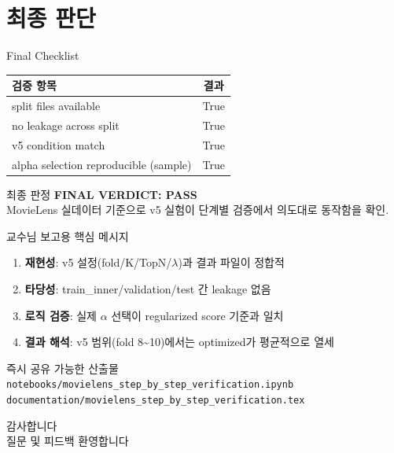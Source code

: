 \documentclass[aspectratio=169,10pt]{beamer}
\begin{document}
\section{최종 판단}

\begin{frame}{Final Checklist}
  \begin{center}
  \renewcommand{\arraystretch}{1.3}
  \begin{tabular}{l|c}
    \toprule
    \textbf{검증 항목} & \textbf{결과} \\
    \midrule
    split files available & True \\
    no leakage across split & True \\
    v5 condition match & True \\
    alpha selection reproducible (sample) & True \\
    \bottomrule
  \end{tabular}
  \end{center}

  \vspace{0.5em}
  \begin{alertblock}{최종 판정}
    \textbf{FINAL VERDICT: PASS} \\
    MovieLens 실데이터 기준으로 v5 실험이 단계별 검증에서 의도대로 동작함을 확인.
  \end{alertblock}
\end{frame}

\begin{frame}{교수님 보고용 핵심 메시지}
  \begin{enumerate}
    \item \textbf{재현성}: v5 설정(fold/K/TopN/\(\lambda\))과 결과 파일이 정합적
    \item \textbf{타당성}: train\_inner/validation/test 간 leakage 없음
    \item \textbf{로직 검증}: 실제 \(\alpha\) 선택이 regularized score 기준과 일치
    \item \textbf{결과 해석}: v5 범위(fold 8\textasciitilde10)에서는 optimized가 평균적으로 열세
  \end{enumerate}

  \vspace{0.5em}
  \begin{block}{즉시 공유 가능한 산출물}
    \texttt{notebooks/movielens\_step\_by\_step\_verification.ipynb} \\
    \texttt{documentation/movielens\_step\_by\_step\_verification.tex}
  \end{block}
\end{frame}

\begin{frame}[plain]
  \begin{center}
    \vspace{2cm}
    {\LARGE 감사합니다}\\[1.2em]
    {\large 질문 및 피드백 환영합니다}
  \end{center}
\end{frame}
\end{document}
